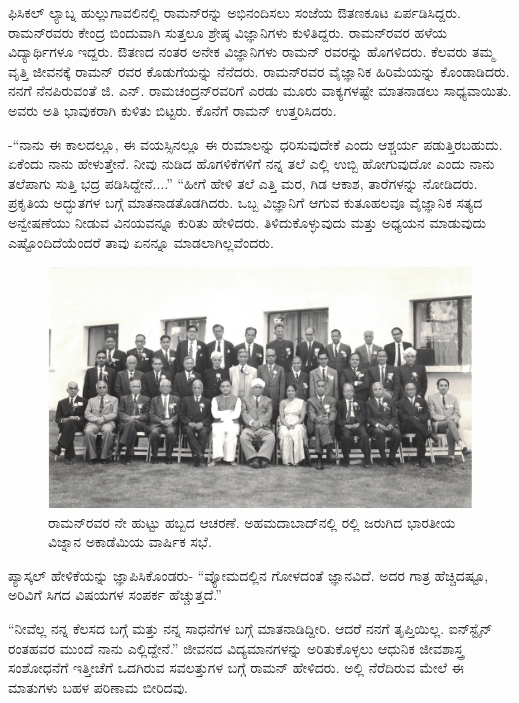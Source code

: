 ಫಿಸಿಕಲ್ ಲ್ಯಾಬ್ನ ಹುಲ್ಲುಗಾವಲಿನಲ್ಲಿ ರಾಮನ್‍ರನ್ನು ಅಭಿನಂದಿಸಲು ಸಂಜೆಯ ಔತಣಕೂಟ ಏರ್ಪಡಿಸಿದ್ದರು. ರಾಮನ್‍ರವರು ಕೇಂದ್ರ ಬಿಂದುವಾಗಿ ಸುತ್ತಲೂ ಶ್ರೇಷ್ಠ ವಿಜ್ಞಾನಿಗಳು ಕುಳಿತಿದ್ದರು. ರಾಮನ್‍ರವರ ಹಳೆಯ ವಿದ್ಯಾರ್ಥಿಗಳೂ ಇದ್ದರು. ಔತಣದ ನಂತರ ಅನೇಕ ವಿಜ್ಞಾನಿಗಳು ರಾಮನ್ ರವರನ್ನು ಹೊಗಳಿದರು. ಕೆಲವರು ತಮ್ಮ ವೃತ್ತಿ ಜೀವನಕ್ಕೆ ರಾಮನ್ ರವರ ಕೊಡುಗೆಯನ್ನು ನೆನೆದರು. ರಾಮನ್‍ರವರ ವೈಜ್ಞಾನಿಕ ಹಿರಿಮೆಯನ್ನು ಕೊಂಡಾಡಿದರು. ನನಗೆ ನೆನಪಿರುವಂತೆ ಜಿ. ಎನ್. ರಾಮಚಂದ್ರನ್‍ರವರಿಗೆ ಎರಡು ಮೂರು ವಾಕ್ಯಗಳಷ್ಟೇ ಮಾತನಾಡಲು ಸಾಧ್ಯವಾಯಿತು. ಅವರು ಅತಿ ಭಾವುಕರಾಗಿ ಕುಳಿತು ಬಿಟ್ಟರು. ಕೊನೆಗೆ ರಾಮನ್ ಉತ್ತರಿಸಿದರು.

 -“ನಾನು ಈ ಕಾಲದಲ್ಲೂ, ಈ ವಯಸ್ಸಿನಲ್ಲೂ ಈ ರುಮಾಲನ್ನು ಧರಿಸುವುದೇಕೆ ಎಂದು ಆಶ್ಚರ್ಯ ಪಡುತ್ತಿರಬಹುದು. ಏಕೆಂದು ನಾನು ಹೇಳುತ್ತೇನೆ. ನೀವು ನುಡಿದ ಹೊಗಳಿಕೆಗಳಿಗೆ ನನ್ನ ತಲೆ ಎಲ್ಲಿ ಉಬ್ಬಿ ಹೋಗುವುದೋ ಎಂದು ನಾನು ತಲೆಪಾಗು ಸುತ್ತಿ ಭದ್ರ ಪಡಿಸಿದ್ದೇನೆ....” “ಹೀಗೆ ಹೇಳಿ ತಲೆ ಎತ್ತಿ ಮರ, ಗಿಡ ಆಕಾಶ, ತಾರೆಗಳನ್ನು ನೋಡಿದರು. ಪ್ರಕೃತಿಯ ಅದ್ಭುತಗಳ ಬಗ್ಗೆ ಮಾತನಾಡತೊಡಗಿದರು. ಒಬ್ಬ ವಿಜ್ಞಾನಿಗೆ ಆಗುವ ಕುತೂಹಲವೂ ವೈಜ್ಞಾನಿಕ ಸತ್ಯದ ಅನ್ವೇಷಣೆಯು ನೀಡುವ ವಿನಯವನ್ನೂ ಕುರಿತು ಹೇಳಿದರು. ತಿಳಿದುಕೊಳ್ಳುವುದು ಮತ್ತು ಅಧ್ಯಯನ ಮಾಡುವುದು ಎಷ್ಟೊಂದಿದೆಯೆಂದರೆ ತಾವು ಏನನ್ನೂ ಮಾಡಲಾಗಿಲ್ಲವೆಂದರು.

\begin{figure}
\includegraphics{"images/13.jpg"}
\caption{ ರಾಮನ್‌ರವರ ನೇ ಹುಟ್ಟು ಹಬ್ಬದ ಆಚರಣೆ. ಅಹಮದಾಬಾದ್‌ನಲ್ಲಿ ರಲ್ಲಿ ಜರುಗಿದ ಭಾರತೀಯ ವಿಜ್ನಾನ ಅಕಾಡೆಮಿಯ ವಾರ್ಷಿಕ ಸಭೆ.}
\end{figure}

ಪ್ಯಾಸ್ಕಲ್ ಹೇಳಿಕೆಯನ್ನು ಜ್ಞಾಪಿಸಿಕೊಂಡರು- “ವ್ಯೋಮದಲ್ಲಿನ ಗೋಳದಂತೆ ಜ್ಞಾನವಿದೆ. ಅದರ ಗಾತ್ರ ಹೆಚ್ಚಿದಷ್ಟೂ, ಅರಿವಿಗೆ ಸಿಗದ ವಿಷಯಗಳ ಸಂಪರ್ಕ ಹೆಚ್ಚುತ್ತದೆ.”

 “ನೀವೆಲ್ಲ ನನ್ನ ಕೆಲಸದ ಬಗ್ಗೆ ಮತ್ತು ನನ್ನ ಸಾಧನೆಗಳ ಬಗ್ಗೆ ಮಾತನಾಡಿದ್ದೀರಿ. ಆದರೆ ನನಗೆ ತೃಪ್ತಿಯಿಲ್ಲ. ಐನ್‍ಸ್ಟೈನ್ ರಂತಹವರ ಮುಂದೆ ನಾನು ಎಲ್ಲಿದ್ದೇನೆ.” ಜೀವನದ ವಿದ್ಯಮಾನಗಳನ್ನು ಅರಿತುಕೊಳ್ಳಲು ಆಧುನಿಕ ಜೀವಶಾಸ್ತ್ರ ಸಂಶೋಧನೆಗೆ ಇತ್ತೀಚೆಗೆ ಒದಗಿರುವ ಸವಲತ್ತುಗಳ ಬಗ್ಗೆ ರಾಮನ್ ಹೇಳಿದರು. ಅಲ್ಲಿ ನೆರೆದಿರುವ ಮೇಲೆ ಈ ಮಾತುಗಳು ಬಹಳ ಪರಿಣಾಮ ಬೀರಿದವು.

